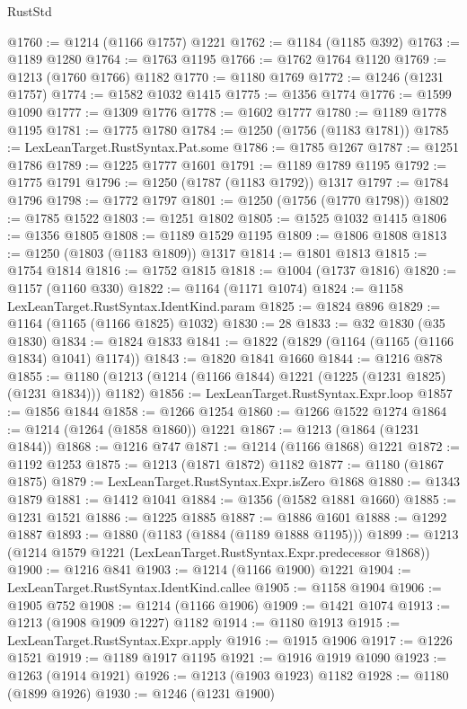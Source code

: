 \begin{lexlean}{RustStd}
\begin{coremodule}
@1760 := @1214 (@1166 @1757) @1221
@1762 := @1184 (@1185 @392)
@1763 := @1189 @1280
@1764 := @1763 @1195
@1766 := @1762 @1764 @1120
@1769 := @1213 (@1760 @1766) @1182
@1770 := @1180 @1769
@1772 := @1246 (@1231 @1757)
@1774 := @1582 @1032 @1415
@1775 := @1356 @1774
@1776 := @1599 @1090
@1777 := @1309 @1776
@1778 := @1602 @1777
@1780 := @1189 @1778 @1195
@1781 := @1775 @1780
@1784 := @1250 (@1756 (@1183 @1781))
@1785 := LexLeanTarget.RustSyntax.Pat.some
@1786 := @1785 @1267
@1787 := @1251 @1786
@1789 := @1225 @1777 @1601
@1791 := @1189 @1789 @1195
@1792 := @1775 @1791
@1796 := @1250 (@1787 (@1183 @1792)) @1317
@1797 := @1784 @1796
@1798 := @1772 @1797
@1801 := @1250 (@1756 (@1770 @1798))
@1802 := @1785 @1522
@1803 := @1251 @1802
@1805 := @1525 @1032 @1415
@1806 := @1356 @1805
@1808 := @1189 @1529 @1195
@1809 := @1806 @1808
@1813 := @1250 (@1803 (@1183 @1809)) @1317
@1814 := @1801 @1813
@1815 := @1754 @1814
@1816 := @1752 @1815
@1818 := @1004 (@1737 @1816)
@1820 := @1157 (@1160 @330)
@1822 := @1164 (@1171 @1074)
@1824 := @1158 LexLeanTarget.RustSyntax.IdentKind.param
@1825 := @1824 @896
@1829 := @1164 (@1165 (@1166 @1825) @1032)
@1830 := 28
@1833 := @32 @1830 (@35 @1830)
@1834 := @1824 @1833
@1841 := @1822 (@1829 (@1164 (@1165 (@1166 @1834) @1041) @1174))
@1843 := @1820 @1841 @1660
@1844 := @1216 @878
@1855 := @1180 (@1213 (@1214 (@1166 @1844) @1221 (@1225 (@1231 @1825) (@1231 @1834))) @1182)
@1856 := LexLeanTarget.RustSyntax.Expr.loop
@1857 := @1856 @1844
@1858 := @1266 @1254
@1860 := @1266 @1522 @1274
@1864 := @1214 (@1264 (@1858 @1860)) @1221
@1867 := @1213 (@1864 (@1231 @1844))
@1868 := @1216 @747
@1871 := @1214 (@1166 @1868) @1221
@1872 := @1192 @1253
@1875 := @1213 (@1871 @1872) @1182
@1877 := @1180 (@1867 @1875)
@1879 := LexLeanTarget.RustSyntax.Expr.isZero @1868
@1880 := @1343 @1879
@1881 := @1412 @1041
@1884 := @1356 (@1582 @1881 @1660)
@1885 := @1231 @1521
@1886 := @1225 @1885
@1887 := @1886 @1601
@1888 := @1292 @1887
@1893 := @1880 (@1183 (@1884 (@1189 @1888 @1195)))
@1899 := @1213 (@1214 @1579 @1221 (LexLeanTarget.RustSyntax.Expr.predecessor @1868))
@1900 := @1216 @841
@1903 := @1214 (@1166 @1900) @1221
@1904 := LexLeanTarget.RustSyntax.IdentKind.callee
@1905 := @1158 @1904
@1906 := @1905 @752
@1908 := @1214 (@1166 @1906)
@1909 := @1421 @1074
@1913 := @1213 (@1908 @1909 @1227) @1182
@1914 := @1180 @1913
@1915 := LexLeanTarget.RustSyntax.Expr.apply
@1916 := @1915 @1906
@1917 := @1226 @1521
@1919 := @1189 @1917 @1195
@1921 := @1916 @1919 @1090
@1923 := @1263 (@1914 @1921)
@1926 := @1213 (@1903 @1923) @1182
@1928 := @1180 (@1899 @1926)
@1930 := @1246 (@1231 @1900)

\end{coremodule}
\end{lexlean}
